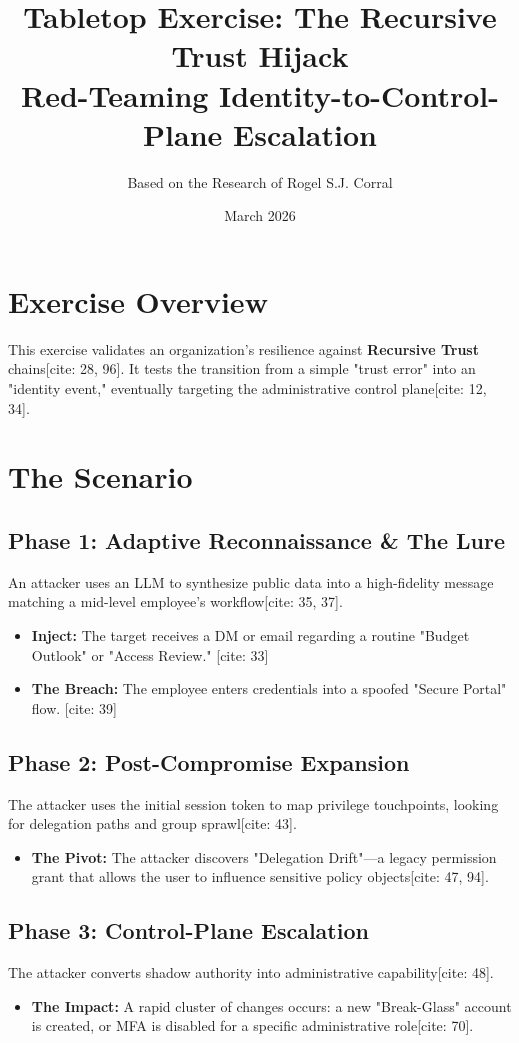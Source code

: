 \documentclass[11pt]{article}
\title{\textbf{Tabletop Exercise: The Recursive Trust Hijack}\\ \large Red-Teaming Identity-to-Control-Plane Escalation}
\author{Based on the Research of Rogel S.J. Corral}
\date{March 2026}
\begin{document}
\maketitle

\section{Exercise Overview}
This exercise validates an organization’s resilience against \textbf{Recursive Trust} chains[cite: 28, 96]. It tests the transition from a simple "trust error" into an "identity event," eventually targeting the administrative control plane[cite: 12, 34].

\section{The Scenario}

\subsection{Phase 1: Adaptive Reconnaissance \& The Lure}
An attacker uses an LLM to synthesize public data into a high-fidelity message matching a mid-level employee’s workflow[cite: 35, 37]. 
\begin{itemize}
    \item \textbf{Inject:} The target receives a DM or email regarding a routine "Budget Outlook" or "Access Review." [cite: 33]
    \item \textbf{The Breach:} The employee enters credentials into a spoofed "Secure Portal" flow. [cite: 39]
\end{itemize}

\subsection{Phase 2: Post-Compromise Expansion}
The attacker uses the initial session token to map privilege touchpoints, looking for delegation paths and group sprawl[cite: 43]. 
\begin{itemize}
    \item \textbf{The Pivot:} The attacker discovers "Delegation Drift"—a legacy permission grant that allows the user to influence sensitive policy objects[cite: 47, 94].
\end{itemize}

\subsection{Phase 3: Control-Plane Escalation}
The attacker converts shadow authority into administrative capability[cite: 48].
\begin{itemize}
    \item \textbf{The Impact:} A rapid cluster of changes occurs: a new "Break-Glass" account is created, or MFA is disabled for a specific administrative role[cite: 70].
\end{itemize}
\end{document}
